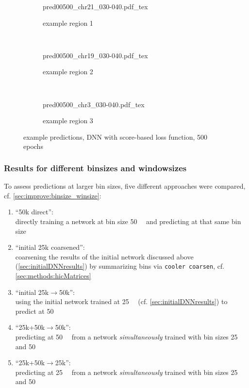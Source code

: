 \begin{figure}[p] %
    \begin{subfigure}{\textwidth}
        \centering
        \scriptsize
        {pred00500_chr21_030-040.pdf_tex}
        \caption{example  region 1} \label{fig:results:scoreloss_r1}
    \end{subfigure}\\[6mm]
    \begin{subfigure}{\textwidth}
        \centering
        \scriptsize
        {pred00500_chr19_030-040.pdf_tex}
        \caption{example region 2} \label{fig:results:scoreloss_r2}
    \end{subfigure}\\[6mm]
    \begin{subfigure}{\textwidth}
        \centering
        \scriptsize
        {pred00500_chr3_030-040.pdf_tex}
        \caption{example region 3} \label{fig:results:scoreloss_r3}
    \end{subfigure}
    \caption{example predictions,  DNN with score-based loss function, 500 epochs} \label{fig:results:scoreloss_matrices}
\end{figure}

\subsubsection{Results for different binsizes and windowsizes} \label{sec:results:binsize_winsize}
To assess predictions at larger bin sizes, five different approaches were compared, cf. \cref{sec:improve:binsize_winsize}:
\begin{enumerate}
 \item ``50k direct'': \\directly training a network at bin size \SI{50}{\kilo\bp} and predicting at that same bin size
 \item ``initial 25k coarsened'': \\coarsening the results of the initial network discussed above (\cref{sec:initialDNNresults})
                    by summarizing bins via \texttt{cooler coarsen}, cf. \cref{sec:methods:hicMatrices}
 \item ``initial 25k$\rightarrow$50k'': \\using the initial network trained at \SI{25}{\kilo\bp} (cf. \cref{sec:initialDNNresults}) to predict at \SI{50}{\kilo\bp}
 \item ``25k+50k$\rightarrow$50k'': \\predicting at \SI{50}{\kilo\bp} from a network \emph{simultaneously} trained with bin sizes 25 and \SI{50}{\kilo\bp}
 \item ``25k+50k$\rightarrow$25k'': \\predicting at \SI{25}{\kilo\bp} from a network \emph{simultaneously} trained with bin sizes 25 and \SI{50}{\kilo\bp}
\end{enumerate}


